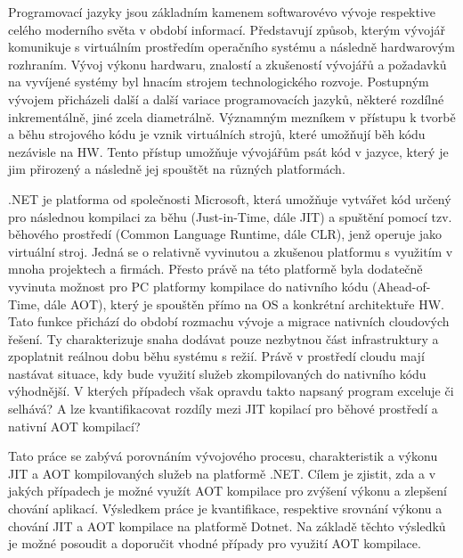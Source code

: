 Programovací jazyky jsou základním kamenem softwarovévo vývoje respektive celého moderního světa v období informací. Představují způsob, kterým vývojář komunikuje s virtuálním prostředím operačního systému a následně hardwarovým rozhraním. Vývoj výkonu hardwaru, znalostí a zkušeností vývojářů a požadavků na vyvíjené systémy byl hnacím strojem technologického rozvoje. Postupným vývojem přicházeli další a další variace programovacích jazyků, některé rozdílné inkrementálně, jiné zcela diametrálně. Významným mezníkem v přístupu k tvorbě a běhu strojového kódu je vznik virtuálních strojů, které umožňují běh kódu nezávisle na HW. Tento přístup umožňuje vývojářům psát kód v jazyce, který je jim přirozený a následně jej spouštět na různých platformách.

.NET je platforma od společnosti Microsoft, která umožňuje vytvářet kód určený pro následnou kompilaci za běhu (Just-in-Time, dále JIT) a spuštění pomocí tzv. běhového prostředí (Common Language Runtime, dále CLR), jenž operuje jako virtuální stroj. Jedná se o relativně vyvinutou a zkušenou platformu s využitím v mnoha projektech a firmách. Přesto právě na této platformě byla dodatečně vyvinuta možnost pro PC platformy kompilace do nativního kódu (Ahead-of-Time, dále AOT), který je spouštěn přímo na OS a konkrétní architektuře HW. Tato funkce přichází do období rozmachu vývoje a migrace nativních cloudových řešení. Ty charakterizuje snaha dodávat pouze nezbytnou část infrastruktury a zpoplatnit reálnou dobu běhu systému s režií. Právě v prostředí cloudu mají nastávat situace, kdy bude využití služeb zkompilovaných do nativního kódu výhodnější. V kterých případech však opravdu takto napsaný program exceluje či selhává? A lze kvantifikacovat rozdíly mezi JIT kopilací pro běhové prostředí a nativní AOT kompilací?

Tato práce se zabývá porovnáním vývojového procesu, charakteristik a výkonu JIT a AOT kompilovaných služeb na platformě .NET. Cílem je zjistit, zda a v jakých případech je možné využít AOT kompilace pro zvýšení výkonu a zlepšení chování aplikací. Výsledkem práce je kvantifikace, respektive srovnání výkonu a chování JIT a AOT kompilace na platformě Dotnet. Na základě těchto výsledků je možné posoudit a doporučit vhodné případy pro využití AOT kompilace.